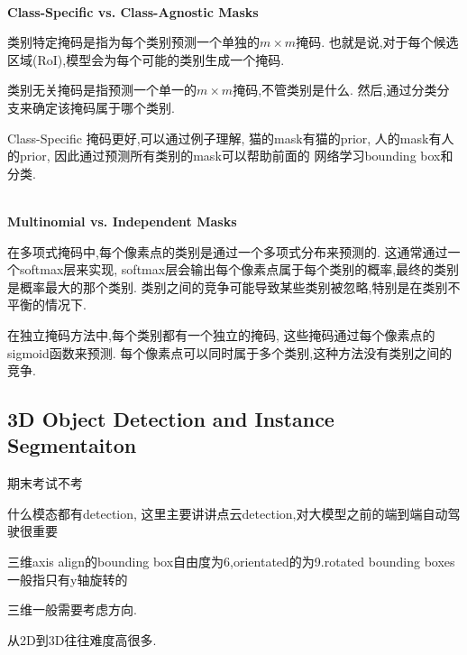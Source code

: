 \textbf{\\Class-Specific vs. Class-Agnostic Masks}

类别特定掩码是指为每个类别预测一个单独的$m \times m$掩码.
也就是说,对于每个候选区域(RoI),模型会为每个可能的类别生成一个掩码.

类别无关掩码是指预测一个单一的$m \times m$掩码,不管类别是什么.
然后,通过分类分支来确定该掩码属于哪个类别.

Class-Specific 掩码更好,可以通过例子理解,
猫的mask有猫的prior, 人的mask有人的prior, 因此通过预测所有类别的mask可以帮助前面的
网络学习bounding box和分类.

\textbf{\\Multinomial vs. Independent Masks}

在多项式掩码中,每个像素点的类别是通过一个多项式分布来预测的.
这通常通过一个softmax层来实现,
softmax层会输出每个像素点属于每个类别的概率,最终的类别是概率最大的那个类别.
类别之间的竞争可能导致某些类别被忽略,特别是在类别不平衡的情况下.

在独立掩码方法中,每个类别都有一个独立的掩码,
这些掩码通过每个像素点的sigmoid函数来预测.
每个像素点可以同时属于多个类别,这种方法没有类别之间的竞争.

\subsection{3D Object Detection and Instance Segmentaiton}

期末考试不考

什么模态都有detection, 这里主要讲讲点云detection,对大模型之前的端到端自动驾驶很重要

三维axis align的bounding box自由度为6,orientated的为9.rotated bounding boxes
一般指只有y轴旋转的

三维一般需要考虑方向.

从2D到3D往往难度高很多.
